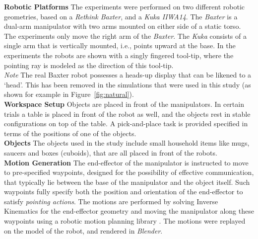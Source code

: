 \documentclass[letterpaper]{article} %
\begin{document}
\noindent\textbf{Robotic Platforms} The experiments were performed on two different robotic geometries, based on a \textit{Rethink Baxter}, and a \textit{Kuka IIWA14}.  The \textit{Baxter} is a dual-arm manipulator with two arms mounted on either side of a static torso. The experiments only move the right arm of the \textit{Baxter}. The \textit{Kuka}  consists of a single arm that is vertically mounted, i.e., points upward at the base. In the experiments the robots are shown with a singly fingered tool-tip, where the pointing ray is modeled as the direction of this tool-tip.\\

\noindent\textit{Note} The real Baxter robot possesses a heads-up display that can be likened to a `head'. This has been removed in the simulations that were used in this study (as shown for example in Figure~\ref{fig:natural}).\\

\noindent\textbf{Workspace Setup} Objects are placed in front of the manipulators. In certain trials a table is placed in front of the robot as well, and the objects rest in stable configurations on top of the table. A pick-and-place task is provided specified in terms of the positions of one of the objects. \\

\noindent\textbf{Objects}  The objects used in the study include small household items like mugs, saucers and boxes (cuboids), that are all placed in front of the robots.\\

\noindent\textbf{Motion Generation}  The end-effector of the manipulator is instructed to move to pre-specified waypoints, designed for the possibility of effective communication, that typically lie between the base of the manipulator and the object itself. Such waypoints fully specify both the position and orientation of the end-effector to satisfy \textit{pointing actions}. The motions are performed by solving Inverse Kinematics for the end-effector geometry and moving the manipulator along these waypoints using a robotic motion planning library \cite{pracsys2014}. The motions were replayed on the model of the robot, and rendered in \textit{Blender}.\\
\end{document}
